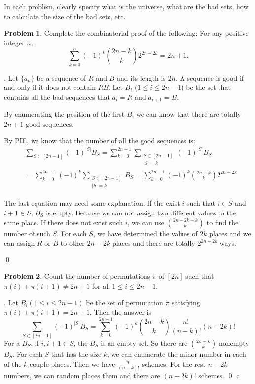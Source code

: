 \documentclass[12pt]{article}
\providecommand{\abs}[1]{\lvert#1\rvert}
\theoremstyle{definition}
\newtheorem{hw}{Problem}
\newenvironment{sol}
  {\par\vspace{3mm}\noindent{\it Solution}.}
  {\qed}
\begin{document}
In each problem, clearly specify what is the universe, what are the bad sets,
how to calculate the size of the bad sets, etc.

\begin{hw}
Complete the combinatorial proof of the following: For any positive integer
$n$,
\[
\sum_{k=0}^n(-1)^k \binom{2n-k}{k} 2^{2n-2k} = 2n+1.
\]
\end{hw}

\begin{sol}
	Let $\{a_n\}$ be a sequence of $R$ and $B$ and its length is $2n$. A sequence is good if and only if it does not contain $RB$. Let $B_i$ ($1 \leq i \leq 2n-1$) be the set that contains all the bad sequences that $a_i = R$ and $a_{i+1} = B$.
	
	By enumerating the position of the first $B$, we can know that there are totally $2n+1$ good sequences. 
	
	By PIE, we know that the number of all the good sequences is:
	\[ \begin{split}
		&   \sum_{S \subset [2n-1]}(-1)^{\abs{S}}B_{S}  
		    = \sum_{k = 0}^{2n-1}\sum_{\substack{S\subset [2n-1]\\ \abs{S}=k}} (-1)^{\abs{S}}B_{S} \\
		&   = \sum_{k = 0}^{2n-1}(-1)^k\sum_{\substack{S\subset [2n-1]\\ \abs{S}=k}}B_{S} 
		    =\sum_{k = 0}^{2n-1}(-1)^k \binom{2n-k}{k}2^{2n-2k}
	\end{split} \]
	
	The last equation may need some explanation. If the exist $i$ such that $i \in S$ and $i+1 \in S$, $B_S$ is empty. Because we can not assign two different values to the same place. If there does not exist such $i$, we can use $\binom{2n-2k + k}{k}$ to find the number of such $S$. For each $S$, we have determined the values of $2k$ places and we can assign $R$ or $B$ to other $2n-2k$ places and there are totally $2^{2n-2k}$ ways. 
	
	
\end{sol}

\begin{hw}
Count the number of permutations $\pi$ of $[2n]$ such that $\pi(i)+ \pi(i+1) \neq 2n+1$ for all $1 \leq i \leq 2n-1$.
\end{hw}

\begin{sol}
	Let $B_i (1 \leq i \leq 2n-1)$ be the set of permutation $\pi$ satisfying $\pi(i) + \pi(i+1) = 2n + 1$. Then the answer is 
	$$
		\sum_{S \subset [2n-1]}(-1)^{\abs{S}}B_S = \sum_{k = 0}^{2n-1}(-1)^k\binom{2n-k}{k}\frac{n!}{(n-k)!}(n-2k)!
	$$
	For a $B_S$, if $i,i+1 \in S$, the $B_S$ is an empty set. So there are $\binom{2n-k}{k}$ nonempty $B_S$. For each $S$ that has the size $k$, we can enumerate the minor number in each of the $k$ couple places. Then we have $\frac{n!}{(n-k)!}$ schemes. For the rest $n-2k$ numbers, we can random places them and there are $(n-2k)!$ schemes. 
\end{sol}
c
\end{document}
